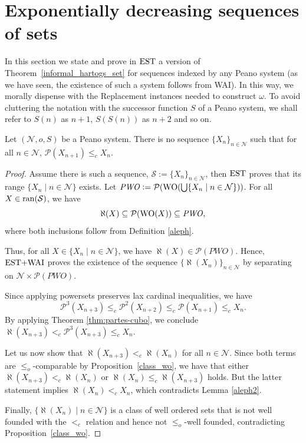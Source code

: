 \section{Exponentially decreasing sequences of sets}

In this section we state and prove in $\estf$ a version of
Theorem~\ref{informal_hartogs_set} for sequences indexed by any Peano
system (as we have seen, the existence of such a system follows from WAI). In this way, we morally dispense with the Replacement instances needed to construct
$\omega$. To avoid cluttering the notation with the successor function $S$ of a
Peano system, we shall refer to $S(n)$ as $n+1$, $S(S(n))$ as $n+2$ and so on.

\begin{theorem}[$\estf$]
	\label{hartogs_set}
	Let $(\mathcal{N},o,S)$ be a Peano system. There is no sequence $\{X_n\}_{n\in \mathcal{N}}$ such that for all $n\in\mathcal{N}$, $\mathcal{P}(X_{n+1}) \leq_c X_n$.
\end{theorem}
\begin{proof}
	Assume there is such a sequence, 
	$\mathcal{S} := \{X_n\}_{n\in \mathcal{N}}$,
	then $\estf$ proves that its range $\{X_n \mid n\in \mathcal{N}\}$ exists.
        Let $\mathit{PWO} \mathrel{\mathop:}= \mathcal{P}(\mathrm{WO}(\mathop{\textstyle\bigcup} \{X_n \mid n\in \mathcal{N}\}))$.
	For all $X\in\operatorname{ran}(\mathcal{S})$, we have 
	\[
	\aleph(X) \subseteq \mathcal{P}(\mathrm{WO}(X)) \subseteq \mathit{PWO},
	\]
	where both inclusions follow from Definition \ref{aleph}.
	
	\noindent Thus, for all $X\in \{X_n \mid n\in \mathcal{N}\}$, we have
        $\aleph(X)\in\mathcal{P}(\mathit{PWO})$. Hence, $\text{EST+WAI}$ proves the
        existence of the sequence $\{\aleph(X_n)\}_{n\in \mathcal{N}}$ by
        separating on $ \mathcal{N}\times\mathcal{P}(\mathit{PWO})$.
	
        Since applying powersets preserves lax cardinal inequalities, we have
        \[
          \mathcal{P}^3(X_{n+3}) \leq_c \mathcal{P}^2(X_{n+2})\leq_c \mathcal{P}(X_{n+1}) \leq_c X_{n}.
        \]
        By applying Theorem \ref{thm:partes-cubo}, we conclude
        $\aleph(X_{n+3}) <_c \mathcal{P}^{3}(X_{n+3}) \leq_c X_n$.
	
	Let us now show that $\aleph(X_{n+3}) <_c \aleph(X_n)$ for all $n\in
        \mathcal{N}$. Since both terms are $\leq_o$-comparable by Proposition~\ref{class_wo}, we have that either
        $\aleph(X_{n+3}) <_c \aleph(X_n)$ or $\aleph(X_n) \leq_c
        \aleph(X_{n+3})$ holds. But the latter statement implies $\aleph(X_n) <_c X_n$, which contradicts Lemma \ref{aleph2}.
	
	Finally, $\{\aleph(X_n) \mid n\in \mathcal{N}\}$
	is a class of well ordered sets that is not well founded with the $<_c$
        relation and hence not $\leq_o$-well founded, contradicting Proposition~\ref{class_wo}.
\end{proof}

